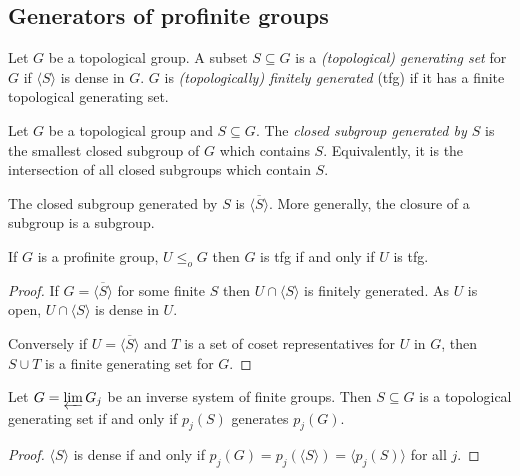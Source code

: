 \documentclass[a4paper]{article}
\begin{document}
\subsection{Generators of profinite groups}

\begin{definition}
  Let \(G\) be a topological group. A subset \(S \subseteq G\) is a \emph{(topological) generating set} for \(G\) if \(\langle S\rangle\) is dense in \(G\). \(G\) is \emph{(topologically) finitely generated} (tfg) if it has a finite topological generating set.
\end{definition}

\begin{definition}
  Let \(G\) be a topological group and \(S \subseteq G\). The \emph{closed subgroup generated by \(S\)} is the smallest closed subgroup of \(G\) which contains \(S\). Equivalently, it is the intersection of all closed subgroups which contain \(S\).
\end{definition}

\begin{ex}
  The closed subgroup generated by \(S\) is \(\overline{\langle S\rangle}\). More generally, the closure of a subgroup is a subgroup.
\end{ex}

\begin{proposition}
  If \(G\) is a profinite group, \(U \leq_o G\) then \(G\) is tfg if and only if \(U\) is tfg. 
\end{proposition}

\begin{proof}
  If \(G = \overline{\langle S\rangle}\) for some finite \(S\) then \(U \cap \langle S\rangle\) is finitely generated. As \(U\) is open, \(U \cap \langle S\rangle\) is dense in \(U\).

  Conversely if \(U = \overline{\langle S\rangle}\) and \(T\) is a set of coset representatives for \(U\) in \(G\), then \(S \cup T\) is a finite generating set for \(G\).
\end{proof}

\begin{proposition}
  Let \(G = \varprojlim G_j\) be an inverse system of finite groups. Then \(S \subseteq G\) is a topological generating set if and only if \(p_j(S)\) generates \(p_j(G)\).
\end{proposition}

\begin{proof}
  \(\langle S\rangle\) is dense if and only if \(p_j(G) = p_j(\langle S\rangle) = \langle p_j(S)\rangle\) for all \(j\).
\end{proof}
\end{document}
